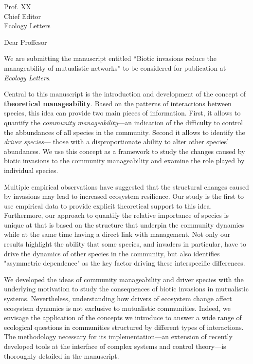 \documentclass[10pt, a4paper]{letter}
\begin{document}
\begin{letter}{
       Prof. XX\\
       Chief Editor\\
       Ecology Letters}

\opening{Dear Proffesor}

We are submitting the manuscript entitled ``Biotic invasions reduce the manageability of mutualistic networks'' to be considered for publication at \emph{Ecology Letters}. 

Central to this manuscript is the introduction and development of the concept of \textbf{theoretical manageability}.
Based on the patterns of interactions between species, this idea can provide two main pieces of information. 
First, it allows to quantify the \textit{community manageability}---an indication of the difficulty to control the abbundances of all species in the community. 
Second it allows to identify the \textit{driver species}--- those with a disproportionate ability to alter other species' abundances.  
We use this concept as a framework to study the changes caused by biotic invasions to the community manageability and examine the role played by individual species. 

Multiple empirical observations have suggested that the structural changes caused by invasions may lead to increased ecosystem resilience. 
Our study is the first to use empirical data to provide explicit theoretical support to this idea. 
Furthermore, our approach to quantify the relative importance of species is unique at that is based on the structure that underpin the community dynamics while at the same time having a direct link with management. 
Not only our results highlight the ability that some species, and invaders in particular, have to drive the dynamics of other species in the community, but also identifies "asymmetric dependence" as the key factor driving these interspecific differences.

We developed the ideas of community manageability and driver species with the underlying motivation to study the consequences of biotic invasions in mutualistic systems. 
Nevertheless, understanding how drivers of ecosystem change affect ecosystem dynamics is not exclusive to mutualistic communities. 
Indeed, we envisage the application of the concepts we introduce to answer a wide range of ecological questions in communities structured by different types of interactions.
The methodology necessary for its implementation---an extension of recently developed tools at the interface of complex systems and control theory---is thoroughly detailed in the manuscript. 


\end{letter}
\end{document}
